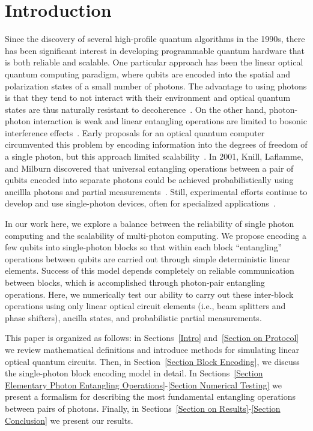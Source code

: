 \documentclass[aps,pra,twocolumn,superscriptaddress,floatfix,10pt]{revtex4}
\begin{document}
\section{Introduction}
 Since the discovery of several high-profile quantum algorithms in the 1990s, there has been significant interest in developing programmable quantum hardware that is both reliable and scalable. One particular approach has been the linear optical quantum computing paradigm, where qubits are encoded into the spatial and polarization states of a small number of photons. The advantage to using photons is that they tend to not interact with their environment and optical quantum states are thus naturally resistant to decoherence~\cite{Review Paper}. On the other hand, photon-photon interaction is weak and linear entangling operations are limited to bosonic interference effects~\cite{Review Paper,Hong Ou Mandel}. Early proposals for an optical quantum computer circumvented this problem by encoding information into the degrees of freedom of a single photon, but this approach limited scalability~\cite{Adami,Torma,Pittman}. In 2001, Knill, Laflamme, and Milburn discovered that universal entangling operations between a pair of qubits encoded into separate photons could be achieved probabilistically using ancillla photons and partial measurements~\cite{KLM,KLM2}. Still, experimental efforts continue to develop and use single-photon devices, often for specialized applications~\cite{Bao,Starek,Barreiro,Graham,Lanyon, Schreiber, Sansoni,Zadeh}.
 
  In our work here, we explore a balance between the reliability of single photon computing and the scalability of multi-photon computing. We propose encoding a few qubits into single-photon blocks so that within each block ``entangling'' operations between qubits are carried out through simple deterministic linear elements. Success of this model depends completely on reliable communication between blocks, which is accomplished through photon-pair entangling operations. Here, we numerically test our ability to carry out these inter-block operations using only linear optical circuit elements  (i.e., beam splitters and phase shifters), ancilla states, and probabilistic partial measurements.
  
  This paper is organized as follows: in Sections~\ref{Intro} and~\ref{Section on Protocol} we review mathematical definitions and introduce methods for simulating linear optical quantum circuits. Then, in Section~\ref{Section Block Encoding}, we discuss the single-photon block encoding model in detail. In Sections~\ref{Section Elementary Photon Entangling Operations}-\ref{Section Numerical Testing} we present a formalism for describing the most fundamental entangling operations between pairs of photons. Finally, in Sections~\ref{Section on Results}-\ref{Section Conclusion} we present our results.
\end{document}
